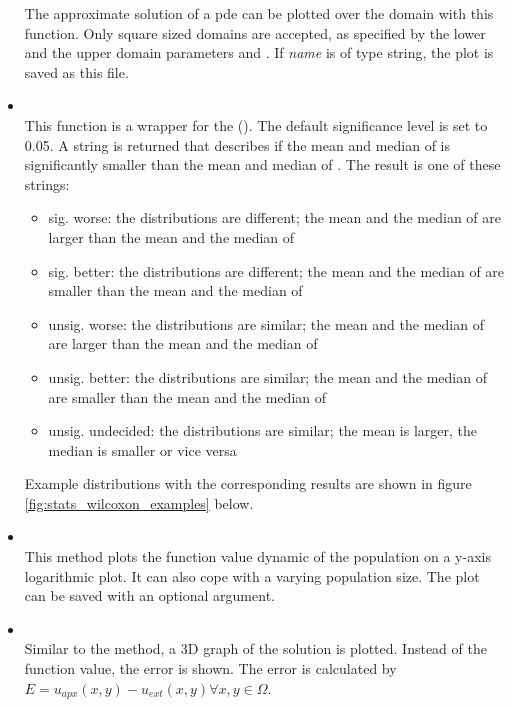 \documentclass[.\jobname.tex]{subfiles}
\begin{document}
\begin{itemize}
	The approximate solution of a \gls{pde} can be plotted over the domain with this function. Only square sized domains are accepted, as specified by the lower and the upper domain parameters  and . If \textit{name} is of type string, the plot is saved as this file.
	\item 
	 \\
	This function is a wrapper for the  (\cite{scipy_scipystatswilcoxon_2020}). The default significance level is set to 0.05. A string is returned that describes if the mean and median of  is significantly smaller than the mean and median of . The result is one of these strings: 
	\begin{itemize}
		\item sig. worse: the distributions are different; the mean and the median of  are larger than the mean and the median of 
		\item sig. better: the distributions are different; the mean and the median of  are smaller than the mean and the median of 
		\item unsig. worse: the distributions are similar; the mean and the median of  are larger than the mean and the median of  
		\item unsig. better: the distributions are similar; the mean and the median of  are smaller than the mean and the median of 
		\item unsig. undecided: the distributions are similar; the mean is larger, the median is smaller or vice versa
	\end{itemize} 
	Example distributions with the corresponding results are shown in figure \ref{fig:stats_wilcoxon_examples} below.
	\item {} \\
	This method plots the function value dynamic of the population on a y-axis logarithmic plot. It can also cope with a varying population size. The plot can be saved with an optional argument. 
	\item {} \\
	Similar to the 	 method, a 3D graph of the solution is plotted. Instead of the function value, the error is shown. The error is calculated by $E  = u_{apx}(x,y) - u_{ext}(x,y) \forall x,y \in \Omega$. 

\end{itemize}
\end{document}
